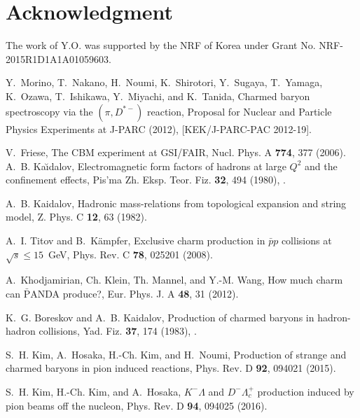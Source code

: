 \documentclass[a4paper,12pt]{article}
\begin{document}
\section*{Acknowledgment}
The work of Y.O. was supported by the NRF of Korea under Grant No. NRF-2015R1D1A1A01059603.

\begin{thebibliography}{99}

Y.~Morino, T.~Nakano, H.~Noumi, K.~Shirotori, Y.~Sugaya, T.~Yamaga, K.~Ozawa,
  T.~Ishikawa, Y.~Miyachi, and K.~Tanida,
\newblock Charmed baryon spectroscopy via the $(\pi, D^{*-})$ reaction,
\newblock Proposal for Nuclear and Particle Physics Experiments at J-PARC
  (2012), [KEK/J-PARC-PAC 2012-19].

V.~Friese,
\newblock The CBM experiment at GSI/FAIR,
\newblock Nucl. Phys. A \textbf{774}, 377 (2006).
A.~B. Ka\u{\i}dalov,
\newblock Electromagnetic form factors of hadrons at large $Q^2$ and the
  confinement effects,
\newblock Pis'ma Zh. Eksp. Teor. Fiz. \textbf{32}, 494 (1980),
.

A.~B. Kaidalov,
\newblock Hadronic mass-relations from topological expansion and string model,
\newblock Z. Phys. C \textbf{12}, 63 (1982).

A.~I. Titov and B.~K{\"a}mpfer,
\newblock Exclusive charm production in $\bar{p}p$ collisions at $\sqrt{s} \le
  15$~GeV,
\newblock Phys. Rev. C \textbf{78}, 025201 (2008).

A.~Khodjamirian, \mbox{Ch}. Klein, \mbox{Th}. Mannel, and Y.-M. Wang,
\newblock How much charm can $\bar{\mbox{P}}$ANDA produce?,
\newblock Eur. Phys. J. A \textbf{48}, 31 (2012).

K.~G. Boreskov and A.~B. Kaidalov,
\newblock Production of charmed baryons in hadron-hadron collisions,
\newblock Yad. Fiz. \textbf{37}, 174 (1983),
.

S.~H. Kim, A.~Hosaka, H.-Ch. Kim, and H.~Noumi,
\newblock Production of strange and charmed baryons in pion induced reactions,
\newblock Phys. Rev. D \textbf{92}, 094021 (2015).

S.~H. Kim, H.-Ch. Kim, and A.~Hosaka,
\newblock $K^- \Lambda$ and $D^- \Lambda_c^+$ production induced by pion beams
  off the nucleon,
\newblock Phys. Rev. D \textbf{94}, 094025 (2016).


\end{thebibliography}
\end{document}

